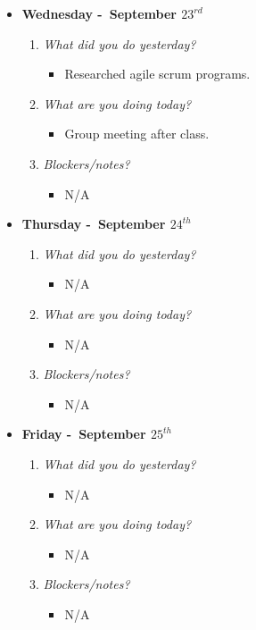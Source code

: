 \begin{itemize}
  \item[] \textbf{\large Wednesday -\ September \(23^{rd}\)}
  \begin{enumerate}
    \item \textsl{What did you do yesterday?}
    \begin{itemize}
      \item Researched agile scrum programs.
    \end{itemize}
    \item \textsl{What are you doing today?}
    \begin{itemize}
      \item Group meeting after class.
    \end{itemize}
    \item \textsl{Blockers/notes?}
    \begin{itemize}
      \item N/A
    \end{itemize}
  \end{enumerate}
\end{itemize}
\textbf{}
\begin{itemize}
  \item[] \textbf{\large Thursday -\ September \(24^{th}\)}
  \begin{enumerate}
    \item \textsl{What did you do yesterday?}
    \begin{itemize}
      \item N/A
    \end{itemize}
    \item \textsl{What are you doing today?}
    \begin{itemize}
      \item N/A
    \end{itemize}
    \item \textsl{Blockers/notes?}
    \begin{itemize}
      \item N/A
    \end{itemize}
  \end{enumerate}
\end{itemize}
\textbf{}
\begin{itemize}
  \item[] \textbf{\large Friday -\ September \(25^{th}\)}
  \begin{enumerate}
    \item \textsl{What did you do yesterday?}
    \begin{itemize}
      \item N/A
    \end{itemize}
    \item \textsl{What are you doing today?}
    \begin{itemize}
      \item N/A
    \end{itemize}
    \item \textsl{Blockers/notes?}
    \begin{itemize}
      \item N/A
    \end{itemize}
  \end{enumerate}
\end{itemize}